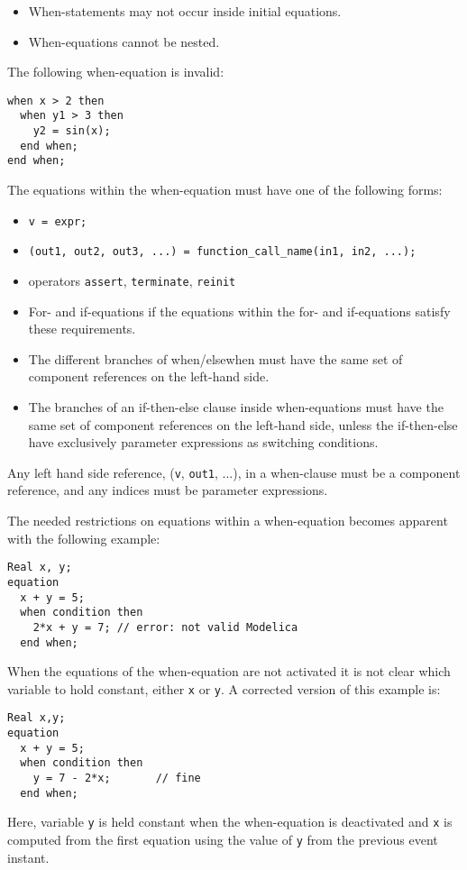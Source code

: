 \begin{itemize}
\item
  When-statements may not occur inside initial equations.
\item
  When-equations cannot be nested.
\end{itemize}

\begin{example}
The following when-equation is invalid:
\begin{lstlisting}[language=modelica]
when x > 2 then
  when y1 > 3 then
    y2 = sin(x);
  end when;
end when;
\end{lstlisting}
\end{example}

The equations within the when-equation must have one of the following
forms:
\begin{itemize}
\item \lstinline!v = expr;!
\item \lstinline!(out1, out2, out3, ...) = function_call_name(in1, in2, ...);!
\item
  operators \lstinline!assert!, \lstinline!terminate!, \lstinline!reinit!
\item
  For- and if-equations if the equations within the for- and
  if-equations satisfy these requirements.
\item
  The different branches of when/elsewhen must have the same set of
  component references on the left-hand side.
\item
  The branches of an if-then-else clause inside when-equations must have
  the same set of component references on the left-hand side, unless the
  if-then-else have exclusively parameter expressions as switching
  conditions.
\end{itemize}

Any left hand side reference, (\lstinline!v!, \lstinline!out1!, ...), in a when-clause must
be a component reference, and any indices must be parameter expressions.

\begin{nonnormative}
The needed restrictions on equations within a when-equation
becomes apparent with the following example:
\begin{lstlisting}[language=modelica]
  Real x, y;
equation
  x + y = 5;
  when condition then
    2*x + y = 7; // error: not valid Modelica
  end when;
\end{lstlisting}

When the equations of the when-equation are not activated it is
not clear which variable to hold constant, either \lstinline!x! or \lstinline!y!.
A corrected version of this example is:
\begin{lstlisting}[language=modelica]
  Real x,y;
equation
  x + y = 5;
  when condition then
    y = 7 - 2*x;       // fine
  end when;
\end{lstlisting}
Here, variable \lstinline!y! is held constant when the when-equation is
deactivated and \lstinline!x! is computed from the first equation using the
value of \lstinline!y! from the previous event instant.
\end{nonnormative}

